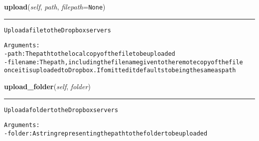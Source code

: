 \hspace{.8\funcindent}\begin{boxedminipage}{\funcwidth}

    \raggedright \textbf{upload}(\textit{self}, \textit{path}, \textit{filepath}={\tt None})

    \vspace{-1.5ex}

    \rule{\textwidth}{0.5\fboxrule}
\setlength{\parskip}{2ex}
\begin{alltt}

Upload a file to the Dropbox servers

Arguments:
- path: The path to the local copy of the file to be uploaded
- filename: The path, including the filename given to the remote copy of the file
    once it is uploaded to Dropbox. If omitted it defaults to being the same as path
\end{alltt}

\setlength{\parskip}{1ex}
    \end{boxedminipage}

    \label{lib:dropbox:Dropbox:upload_folder}

    \vspace{0.5ex}

\hspace{.8\funcindent}\begin{boxedminipage}{\funcwidth}

    \raggedright \textbf{upload\_folder}(\textit{self}, \textit{folder})

    \vspace{-1.5ex}

    \rule{\textwidth}{0.5\fboxrule}
\setlength{\parskip}{2ex}
\begin{alltt}

Upload a folder to the Dropbox servers

Arguments:
- folder: A string representing the path to the folder to be uploaded
\end{alltt}

\setlength{\parskip}{1ex}
    \end{boxedminipage}

    \label{lib:dropbox:Dropbox:get_link}

